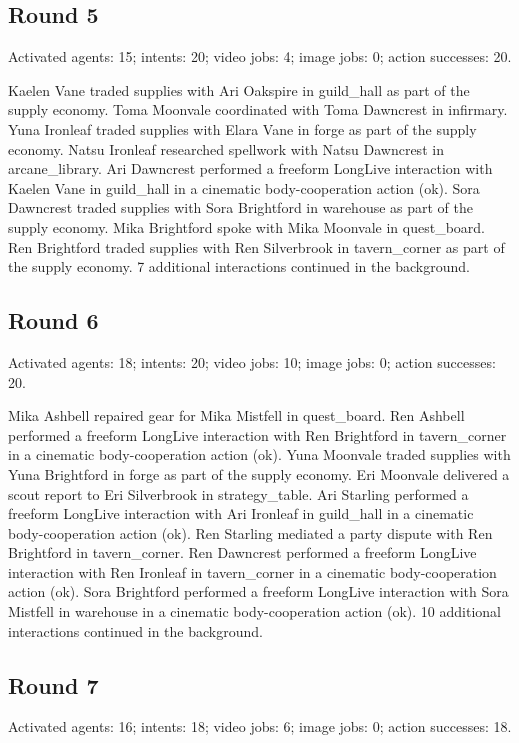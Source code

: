 \documentclass[11pt,a4paper]{article}
\begin{document}
\subsection{Round 5}
Activated agents: 15; intents: 20; video jobs: 4; image jobs: 0; action successes: 20.

Kaelen Vane traded supplies with Ari Oakspire in guild\_hall as part of the supply economy. Toma Moonvale coordinated with Toma Dawncrest in infirmary. Yuna Ironleaf traded supplies with Elara Vane in forge as part of the supply economy. Natsu Ironleaf researched spellwork with Natsu Dawncrest in arcane\_library. Ari Dawncrest performed a freeform LongLive interaction with Kaelen Vane in guild\_hall in a cinematic body-cooperation action (ok). Sora Dawncrest traded supplies with Sora Brightford in warehouse as part of the supply economy. Mika Brightford spoke with Mika Moonvale in quest\_board. Ren Brightford traded supplies with Ren Silverbrook in tavern\_corner as part of the supply economy. 7 additional interactions continued in the background.

\subsection{Round 6}
Activated agents: 18; intents: 20; video jobs: 10; image jobs: 0; action successes: 20.

Mika Ashbell repaired gear for Mika Mistfell in quest\_board. Ren Ashbell performed a freeform LongLive interaction with Ren Brightford in tavern\_corner in a cinematic body-cooperation action (ok). Yuna Moonvale traded supplies with Yuna Brightford in forge as part of the supply economy. Eri Moonvale delivered a scout report to Eri Silverbrook in strategy\_table. Ari Starling performed a freeform LongLive interaction with Ari Ironleaf in guild\_hall in a cinematic body-cooperation action (ok). Ren Starling mediated a party dispute with Ren Brightford in tavern\_corner. Ren Dawncrest performed a freeform LongLive interaction with Ren Ironleaf in tavern\_corner in a cinematic body-cooperation action (ok). Sora Brightford performed a freeform LongLive interaction with Sora Mistfell in warehouse in a cinematic body-cooperation action (ok). 10 additional interactions continued in the background.

\subsection{Round 7}
Activated agents: 16; intents: 18; video jobs: 6; image jobs: 0; action successes: 18.
\end{document}
